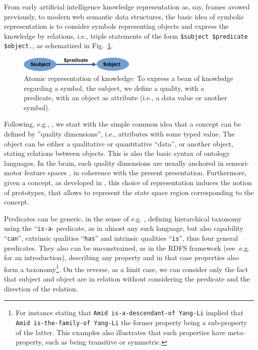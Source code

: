 \documentclass[a4]{article}
\begin{document}
From early artificial intelligence knowledge representation as, say, frames avowed previously, to modern web semantic data structures, the basic idea of symbolic representation is to consider symbols representing objects and express the knowledge by relations, i.e., triple statements of the form {\tt \$subject \$predicate \$object.}, as schematized in Fig.~\ref{triple}.

\begin{figure}[htbp]
\centerline{\includegraphics[width=0.5\textwidth]{figures/triple.png}}
\caption{Atomic representation of knowledge: To express a bean of knowledge regarding a symbol, the subject, we define a quality, with a predicate, with an object as attribute (i.e., a data value or another symbol).}
\label{triple}
\end{figure}

Following, e.g., \cite{gardenfors_conceptual_2004}, we start with the simple common idea that a concept can be defined by ”quality dimensions”, i.e., attributes with some typed value. The object can be either a qualitative or quantitative ``data'', or another object, stating relations between objects. This is also the basic syntax of ontology languages. In the brain, such quality dimensions are usually anchored in sensori-motor feature spaces \cite{freksa_strong_2015}, in coherence with the present presentation. Furthermore, given a concept, as developed in \cite{gardenfors_conceptual_2004}, this choice of representation induces the notion of prototypes, that allows to represent the state space region corresponding to the concept.

Predicates can be generic, in the sense of e.g. \cite{mcclelland_parallel_2003}, defining hierarchical taxonomy using the “{\tt is-a}- predicate, as in almost any such language, but also capability “{\tt can}”, extrinsic qualities “{\tt has}” and intrinsic qualities “{\tt is}”, thus four general predicates. They also can be unconstrained, as in the RDFS framework (see .e.g. \cite{noy_ontology_2001} for an introduction), describing any property and in that case properties also form a taxonomy\footnote{For instance stating that {\tt Amid is-a-descendant-of Yang-Li} implied that {\tt Amid is-the-family-of Yang-Li} the former property being a sub-property of the latter. This examples also illustrates that such properties have meta-property, such as being transitive or symmetric.}. On the reverse, as a limit case, we can consider only the fact that subject and object are in relation without considering the predicate and the direction of the relation.
\end{document}

